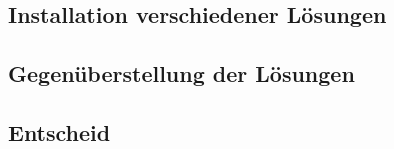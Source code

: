 \subsection{Installation verschiedener Lösungen}






\subsection{Gegenüberstellung der Lösungen}

\subsection{Entscheid}